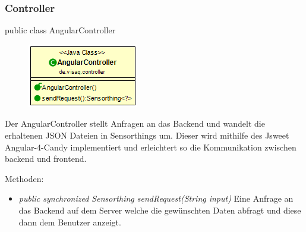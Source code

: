 \clearpage %
\subsubsection{Controller}

public class AngularController

\begin{minipage}{0.4\textwidth}
    \begin{figure}[H]
        {\centering\includegraphics[scale = 0.7]{media/frontend/controller/AngularController_Class.png}}
    \end{figure}
    \end{minipage} \hfill
    \begin{minipage}{0.6\textwidth}
Der AngularController stellt Anfragen an das Backend und wandelt die erhaltenen JSON Dateien in Sensorthings um. Dieser wird mithilfe des \gls{Jsweet} \gls{Angular-4-Candy} implementiert und erleichtert so die Kommunikation zwischen backend und frontend.
\end{minipage}
Methoden: \begin{itemize}
    \item \emph{public synchronized Sensorthing sendRequest(String input)} Eine Anfrage an das Backend auf dem Server welche die gewünschten Daten abfragt und diese dann dem Benutzer anzeigt.
\end{itemize}
